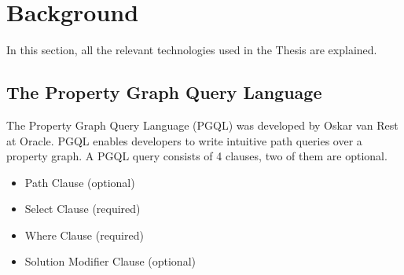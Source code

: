 \documentclass[11pt,singlecolumn]{scrartcl}
\begin{document}
\section{Background}
In this section, all the relevant technologies used in the Thesis are explained.
\subsection{The Property Graph Query Language}

The Property Graph Query Language (PGQL) was developed by Oskar van Rest at Oracle. \cite{vanRest:2016} PGQL enables developers to write intuitive path queries over a property graph. A PGQL query consists of 4 clauses, two of them are optional.
\begin{itemize} 
\item Path Clause (optional)
\item Select Clause (required)
\item Where Clause (required)
\item Solution Modifier Clause (optional)
\end{itemize}
\end{document}
